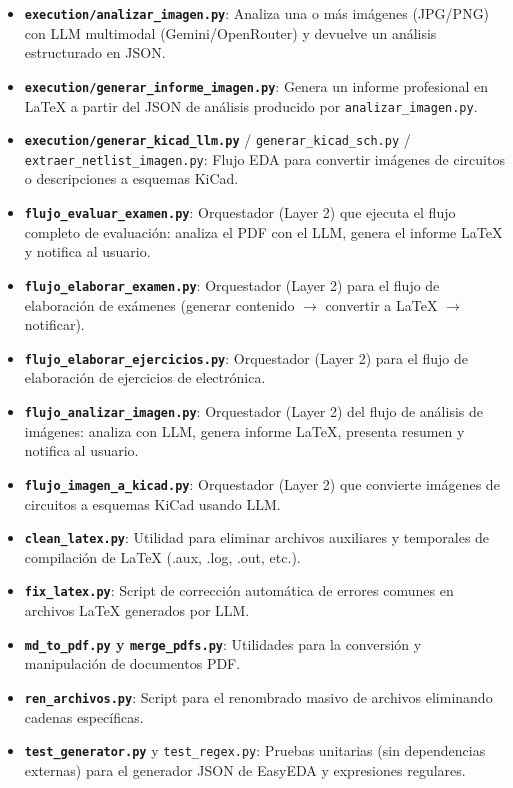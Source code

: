 \documentclass[12pt,a4paper]{article}
\begin{document}
\begin{itemize}
    \item \textbf{\texttt{execution/analizar\_imagen.py}}: Analiza una o más imágenes (JPG/PNG) con LLM multimodal (Gemini/OpenRouter) y devuelve un análisis estructurado en JSON.
    \item \textbf{\texttt{execution/generar\_informe\_imagen.py}}: Genera un informe profesional en LaTeX a partir del JSON de análisis producido por \texttt{analizar\_imagen.py}.
    \item \textbf{\texttt{execution/generar\_kicad\_llm.py}} / \texttt{generar\_kicad\_sch.py} / \texttt{extraer\_netlist\_imagen.py}: Flujo EDA para convertir imágenes de circuitos o descripciones a esquemas KiCad.
    \item \textbf{\texttt{flujo\_evaluar\_examen.py}}: Orquestador (Layer 2) que ejecuta el flujo completo de evaluación: analiza el PDF con el LLM, genera el informe LaTeX y notifica al usuario.
    \item \textbf{\texttt{flujo\_elaborar\_examen.py}}: Orquestador (Layer 2) para el flujo de elaboración de exámenes (generar contenido $\to$ convertir a LaTeX $\to$ notificar).
    \item \textbf{\texttt{flujo\_elaborar\_ejercicios.py}}: Orquestador (Layer 2) para el flujo de elaboración de ejercicios de electrónica.
    \item \textbf{\texttt{flujo\_analizar\_imagen.py}}: Orquestador (Layer 2) del flujo de análisis de imágenes: analiza con LLM, genera informe LaTeX, presenta resumen y notifica al usuario.
    \item \textbf{\texttt{flujo\_imagen\_a\_kicad.py}}: Orquestador (Layer 2) que convierte imágenes de circuitos a esquemas KiCad usando LLM.
    \item \textbf{\texttt{clean\_latex.py}}: Utilidad para eliminar archivos auxiliares y temporales de compilación de LaTeX (.aux, .log, .out, etc.).
    \item \textbf{\texttt{fix\_latex.py}}: Script de corrección automática de errores comunes en archivos LaTeX generados por LLM.
    \item \textbf{\texttt{md\_to\_pdf.py} y \texttt{merge\_pdfs.py}}: Utilidades para la conversión y manipulación de documentos PDF.
    \item \textbf{\texttt{ren\_archivos.py}}: Script para el renombrado masivo de archivos eliminando cadenas específicas.
    \item \textbf{\texttt{test\_generator.py}} y \texttt{test\_regex.py}: Pruebas unitarias (sin dependencias externas) para el generador JSON de EasyEDA y expresiones regulares.

\end{itemize}
\end{document}
